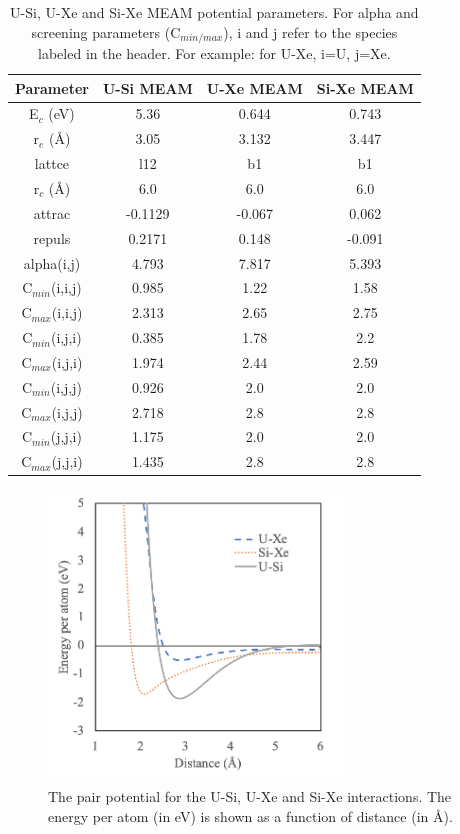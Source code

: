\documentclass[review]{elsarticle}
\begin{document}
\begin{table}[h]
\caption{U-Si, U-Xe and Si-Xe MEAM potential parameters. For alpha and screening parameters (C$_{min/max}$), i and j refer to the species labeled in the header. For example: for U-Xe, i=U, j=Xe. }\label{tab:meam}
\begin{center}
\begin{tabular}{|c|c|c|c|}
 \hline
 Parameter & U-Si MEAM \cite{beelerusi} & U-Xe MEAM & Si-Xe MEAM \\
 \hline
 E$_{c}$ (eV) & 5.36 & 0.644 & 0.743 \\ 
 r$_{e}$ (\AA) & 3.05 & 3.132 & 3.447 \\
 lattce & l12 & b1 & b1\\
 r$_{c}$ (\AA) & 6.0 & 6.0 & 6.0\\
 attrac & -0.1129 & -0.067 & 0.062 \\
 repuls & 0.2171 & 0.148 & -0.091 \\
 alpha(i,j) & 4.793 & 7.817 & 5.393 \\
 C$_{min}$(i,i,j) & 0.985 &1.22 & 1.58\\
 C$_{max}$(i,i,j) & 2.313 & 2.65 & 2.75\\
 C$_{min}$(i,j,i) & 0.385 & 1.78 & 2.2 \\
 C$_{max}$(i,j,i) & 1.974 & 2.44 & 2.59\\
 C$_{min}$(i,j,j) & 0.926 & 2.0 & 2.0\\
 C$_{max}$(i,j,j) & 2.718 & 2.8 & 2.8\\
 C$_{min}$(j,j,i) & 1.175 & 2.0 & 2.0\\ 
 C$_{max}$(j,j,i) & 1.435 & 2.8 & 2.8 \\
 \hline
\end{tabular}
\end{center}
\label{default}
\end{table}%

\begin{figure}[hbt]
	\centering
	\includegraphics[width=0.7\textwidth]{dimer_E.png}
 \caption{ The pair potential for the U-Si, U-Xe and Si-Xe interactions. The energy per atom (in eV) is shown as a function of distance (in \AA). }\label{fig:dimer}
\end{figure}
\end{document}
